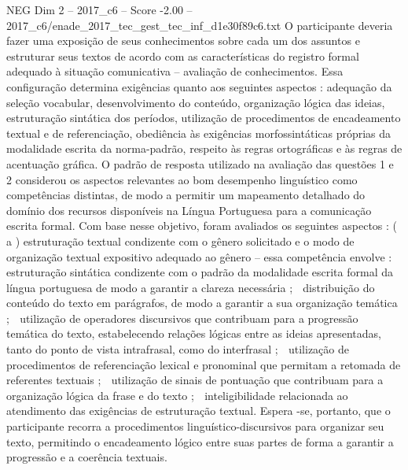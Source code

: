 \begin{textsample}{NEG Dim 2 – 2017\_c6 – Score -2.00 – 2017\_c6/enade\_2017\_tec\_gest\_tec\_inf\_d1e30f89c6.txt}
O participante deveria fazer uma exposição de seus conhecimentos sobre cada um dos assuntos e estruturar seus textos de acordo com as características do registro formal adequado à situação comunicativa – avaliação de conhecimentos.
Essa configuração determina exigências quanto aos seguintes aspectos : adequação da seleção vocabular, desenvolvimento do conteúdo, organização lógica das ideias, estruturação sintática dos períodos, utilização de procedimentos de encadeamento textual e de referenciação, obediência às exigências morfossintáticas próprias da modalidade escrita da norma-padrão, respeito às regras ortográficas e às regras de acentuação gráfica.
O padrão de resposta utilizado na avaliação das questões 1 e 2 considerou os aspectos relevantes ao bom desempenho linguístico como competências distintas, de modo a permitir um mapeamento detalhado do domínio dos recursos disponíveis na Língua Portuguesa para a comunicação escrita formal.
Com base nesse objetivo, foram avaliados os seguintes aspectos : ( a ) estruturação textual condizente com o gênero solicitado e o modo de organização textual expositivo adequado ao gênero – essa competência envolve :  estruturação sintática condizente com o padrão da modalidade escrita formal da língua portuguesa de modo a garantir a clareza necessária ;  distribuição do conteúdo do texto em parágrafos, de modo a garantir a sua organização temática ;  utilização de operadores discursivos que contribuam para a progressão temática do texto, estabelecendo relações lógicas entre as ideias apresentadas, tanto do ponto de vista intrafrasal, como do interfrasal ;  utilização de procedimentos de referenciação lexical e pronominal que permitam a retomada de referentes textuais ;  utilização de sinais de pontuação que contribuam para a organização lógica da frase e do texto ;  inteligibilidade relacionada ao atendimento das exigências de estruturação textual.
Espera -se, portanto, que o participante recorra a procedimentos linguístico-discursivos para organizar seu texto, permitindo o encadeamento lógico entre suas partes de forma a garantir a progressão e a coerência textuais.

\end{textsample}
